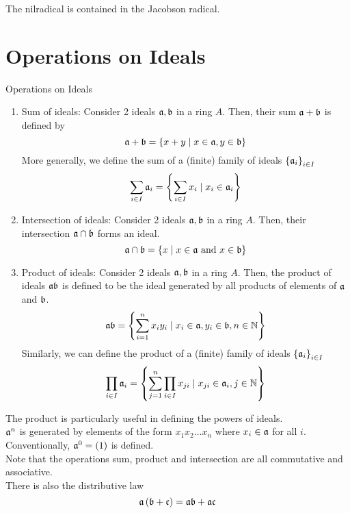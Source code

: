 \begin{note}
	The nilradical is contained in the Jacobson radical.
\end{note}


\section{Operations on Ideals}
\begin{defn}{Operations on Ideals}{}
	\begin{enumerate}
		\item Sum of ideals: Consider 2 ideals \( \mathfrak{a}, \mathfrak{b} \) in a ring
		\( A \).
		Then, their sum \( \mathfrak{a} + \mathfrak{b} \) is defined by
		\[
			\mathfrak{a} + \mathfrak{b} = \left\{ x + y \mid x \in \mathfrak{a}, y \in \mathfrak{b} \right\}
		\]
		More generally, we define the sum of a (finite) family of ideals
		\( \left\{ \mathfrak{a}_i \right\}_{i \in I} \)
		\[
			\sum_{i \in I} \mathfrak{a}_i = \left\{ \sum_{i \in I} x_i \mid
			x_i \in \mathfrak{a}_i \right\}
		\]

		\item Intersection of ideals: Consider 2 ideals \( \mathfrak{a}, \mathfrak{b} \)
		in a ring \( A \).
		Then, their intersection \( \mathfrak{a} \cap \mathfrak{b} \) forms an ideal.
		\[
			\mathfrak{a} \cap \mathfrak{b} = \left\{ x \mid x \in \mathfrak{a} \text{ and } x \in \mathfrak{b} \right\}
		\]

		\item Product of ideals: Consider 2 ideals \( \mathfrak{a}, \mathfrak{b} \) in a
		ring \( A \).
		Then, the product of ideals \( \mathfrak{a} \mathfrak{b} \) is defined to be
		the ideal generated by all products of elements of \( \mathfrak{a} \)
		and \( \mathfrak{b} \).
		\[
			\mfa \mfb = \fbrak{\sum_{i=1}^n x_i y_i
			\mid x_i \in \mfa, y_i \in \mfb, n \in \NN}
		\]
		Similarly, we can define the product of a (finite) family of ideals
		\( \left\{ \mathfrak{a}_i \right\}_{i \in I} \)
		\[
			\prod_{i \in I} \mfa_i = \fbrak{\sum_{j=1}^n \prod_{i \in I}
				x_{ji} \mid x_{ji} \in \mfa_i, j \in \NN}
		\]
	\end{enumerate}
\end{defn}
The product is particularly useful in defining the powers of ideals. \\
\( \mathfrak{a}^n \) is generated by elements of the form
\( x_1 x_2 \ldots x_n \) where \( x_i \in \mathfrak{a} \) for all \( i \). \\
Conventionally, \( \mathfrak{a}^0 = \left( 1 \right) \) is defined. \\

Note that the operations sum, product and intersection are all
commutative and associative. \\
There is also the distributive law
\[
	\mathfrak{a} \left( \mathfrak{b} + \mathfrak{c} \right) = \mathfrak{a} \mathfrak{b} + \mathfrak{a} \mathfrak{c}
\]

